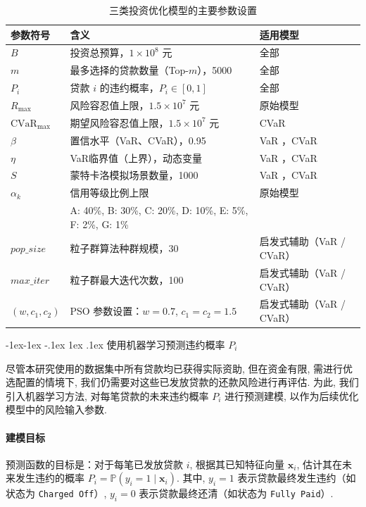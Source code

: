\documentclass{write_paper}
\makeatletter
\renewcommand\subsection{\@startsection{subsection}{2}{\z@}%
                                     {-1ex\@plus -1ex \@minus -.1ex}%
                                     {1ex \@plus .1ex}%
                                     {\normalfont \normalsize \bfseries}}
\makeatother
\begin{document}
\begin{table}[htbp]
\centering
\caption{三类投资优化模型的主要参数设置}
\begin{tabular}{lll}
\toprule
\textbf{参数符号} &{含义} &{适用模型} \\
\midrule
$B$ & 投资总预算，$1 \times 10^8$ 元 & 全部 \\
$m$ & 最多选择的贷款数量（Top-$m$），5000 & 全部 \\
$P_i$ & 贷款 $i$ 的违约概率，$P_i \in [0, 1]$ & 全部 \\
$R_{\max}$ & 风险容忍值上限，$1.5 \times 10^7$ 元 & 原始模型 \\
$\text{CVaR}_{\max}$ & 期望风险容忍值上限，$1.5 \times 10^7$ 元 & CVaR\\
$\beta$ & 置信水平（VaR、CVaR），0.95 & VaR ，CVaR\\
$\eta$ & VaR临界值（上界），动态变量 & VaR ，CVaR\\
$S$ & 蒙特卡洛模拟场景数量，1000 & VaR ，CVaR\\
$\alpha_k$ & 信用等级比例上限 & 原始模型\\
& \quad A: 40\%, B: 30\%, C: 20\%, D: 10\%, E: 5\%, F: 2\%, G: 1\% & \\
$pop\_size$ & 粒子群算法种群规模，30 & 启发式辅助（VaR / CVaR） \\
$max\_iter$ & 粒子群最大迭代次数，100 & 启发式辅助（VaR / CVaR） \\
$(w, c_1, c_2)$ & PSO 参数设置：$w=0.7$, $c_1=c_2=1.5$ & 启发式辅助（VaR / CVaR） \\
\bottomrule
\end{tabular}
\label{tab:three-model-params}
\end{table}
\subsection{使用机器学习预测违约概率 $P_i$}
\label{subsec:predict_p_i}

尽管本研究使用的数据集中所有贷款均已获得实际资助, 但在资金有限, 需进行优选配置的情境下, 我们仍需要对这些已发放贷款的还款风险进行再评估. 为此, 我们引入机器学习方法, 对每笔贷款的未来违约概率 $P_i$ 进行预测建模, 以作为后续优化模型中的风险输入参数. 

\paragraph{建模目标} 
预测函数的目标是：对于每笔已发放贷款 $i$, 根据其已知特征向量 $\mathbf{x}_i$, 估计其在未来发生违约的概率 $P_i = \mathbb{P}(y_i = 1 \mid \mathbf{x}_i)$. 其中, $y_i=1$ 表示贷款最终发生违约（如状态为 \texttt{Charged Off}）, $y_i=0$ 表示贷款最终还清（如状态为 \texttt{Fully Paid}）. 
\end{document}
